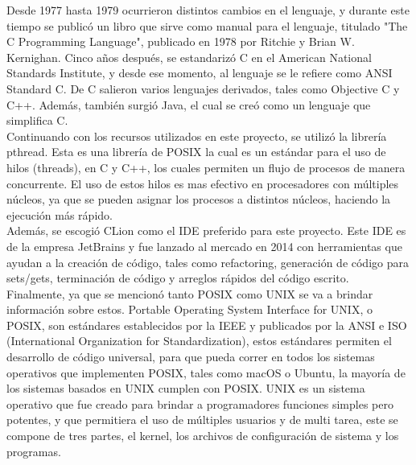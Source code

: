 \documentclass[10pt, article, natbib]{IEEEtran}
\begin{document}
Desde 1977 hasta 1979 ocurrieron distintos cambios en el lenguaje, y durante este tiempo se publicó un libro que sirve como manual para el lenguaje, titulado "The C Programming Language", publicado en 1978 por Ritchie y Brian W. Kernighan. Cinco años después, se estandarizó C en el American National Standards Institute, y desde ese momento, al lenguaje se le refiere como ANSI Standard C. De C salieron varios lenguajes derivados, tales como Objective C y C++. Además, también surgió Java, el cual se creó como un lenguaje que simplifica C.\cite{mritchie_1993_the}\\

Continuando con los recursos utilizados en este proyecto, se utilizó la librería pthread. Esta es una librería de POSIX la cual es un estándar para el uso de hilos (threads), en C y C++, los cuales permiten un flujo de procesos de manera concurrente. El uso de estos hilos es mas efectivo en procesadores con múltiples núcleos, ya que se pueden asignar los procesos a distintos núcleos, haciendo la ejecución más rápido.\cite{ippolito_2020_linux}\\

Además, se escogió CLion como el IDE preferido para este proyecto. Este IDE es de la empresa JetBrains y fue lanzado al mercado en 2014\cite{avram_2014_jetbrains} con herramientas que ayudan a la creación de código, tales como refactoring, generación de código para sets/gets, terminación de código y arreglos rápidos del código escrito.\cite{jetbrains_intelligent}\\

Finalmente, ya que se mencionó tanto POSIX como UNIX se va a brindar información sobre estos. Portable Operating System Interface for UNIX, o POSIX, son estándares establecidos por la IEEE y publicados por la ANSI e ISO (International Organization for Standardization), estos estándares permiten el desarrollo de código universal, para que pueda correr en todos los sistemas operativos que implementen POSIX, tales como macOS o Ubuntu, la mayoría de los sistemas basados en UNIX cumplen con POSIX.\cite{universityinformationtechnologyservices_2021_about} UNIX es un sistema operativo que fue creado para brindar a programadores funciones simples pero potentes, y que permitiera el uso de múltiples usuarios y de multi tarea, este se compone de tres partes, el kernel, los archivos de configuración de sistema y los programas.\cite{idahostateuniversity_1997_what}
\end{document}
